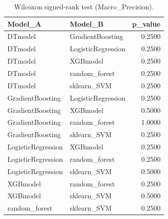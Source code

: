 \begin{table}[t]
\centering
\begin{tabular}{llr}
\toprule
Model_A & Model_B & p_value \\
\midrule
DTmodel & GradientBoosting & 0.2500 \\
DTmodel & LogisticRegression & 0.2500 \\
DTmodel & XGBmodel & 0.2500 \\
DTmodel & random_forest & 0.2500 \\
DTmodel & sklearn_SVM & 0.2500 \\
GradientBoosting & LogisticRegression & 0.2500 \\
GradientBoosting & XGBmodel & 0.5000 \\
GradientBoosting & random_forest & 1.0000 \\
GradientBoosting & sklearn_SVM & 0.2500 \\
LogisticRegression & XGBmodel & 0.2500 \\
LogisticRegression & random_forest & 0.2500 \\
LogisticRegression & sklearn_SVM & 0.5000 \\
XGBmodel & random_forest & 0.2500 \\
XGBmodel & sklearn_SVM & 0.5000 \\
random_forest & sklearn_SVM & 0.2500 \\
\bottomrule
\end{tabular}
\caption{Wilcoxon signed-rank test (Macro_Precision).}
\label{tab:wilcoxon_Macro_Precision}
\end{table}